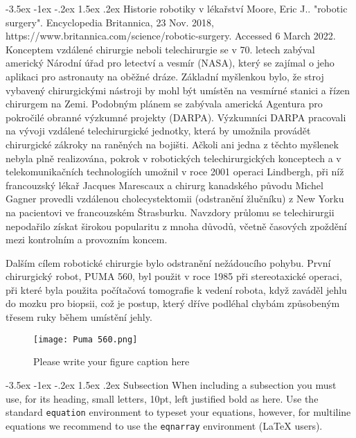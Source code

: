 \documentclass[a4paper,12pt]{article}
\makeatletter
\theoremstyle{definition}
\renewcommand\section{\@startsection {section}{1}{\z@}%
                                   {-3.5ex \@plus -1ex \@minus -.2ex}%
                                   {1.5ex \@plus.2ex}%
                                   {\large\bfseries}}
\renewcommand\subsection{\@startsection {subsection}{1}{\z@}%
                                   {-3.5ex \@plus -1ex \@minus -.2ex}%
                                   {1.5ex \@plus.2ex}%
                                   {\normalsize\bfseries}}
\makeatother
\begin{document}
\pagebreak

\section{Historie robotiky v lékařství}
\label{sec:2}
Moore, Eric J.. "robotic surgery". Encyclopedia Britannica, 23 Nov. 2018, https://www.britannica.com/science/robotic-surgery. Accessed 6 March 2022.
\\

Konceptem vzdálené chirurgie neboli telechirurgie se v 70. letech zabýval americký Národní úřad pro letectví a vesmír (NASA), který se zajímal o jeho aplikaci pro astronauty na oběžné dráze. Základní myšlenkou bylo, že stroj vybavený chirurgickými nástroji by mohl být umístěn na vesmírné stanici a řízen chirurgem na Zemi. Podobným plánem se zabývala americká Agentura pro pokročilé obranné výzkumné projekty (DARPA). Výzkumníci DARPA pracovali na vývoji vzdálené telechirurgické jednotky, která by umožnila provádět chirurgické zákroky na raněných na bojišti. Ačkoli ani jedna z těchto myšlenek nebyla plně realizována, pokrok v robotických telechirurgických konceptech a v telekomunikačních technologiích umožnil v roce 2001 operaci Lindbergh, při níž francouzský lékař Jacques Marescaux a chirurg kanadského původu Michel Gagner provedli vzdálenou cholecystektomii (odstranění žlučníku) z New Yorku na pacientovi ve francouzském Štrasburku. Navzdory průlomu se telechirurgii nepodařilo získat širokou popularitu z mnoha důvodů, včetně časových zpoždění mezi kontrolním a provozním koncem.

Dalším cílem robotické chirurgie bylo odstranění nežádoucího pohybu. První chirurgický robot, PUMA 560, byl použit v roce 1985 při stereotaxické operaci, při které byla použita počítačová tomografie k vedení robota, když zaváděl jehlu do mozku pro biopsii, což je postup, který dříve podléhal chybám způsobeným třesem ruky během umístění jehly.

\begin{figure}[h]
\begin{center}
\texttt{[image: Puma 560.png]}
\caption{Please write your figure caption here}
\label{fig:1}
\end{center}
\end{figure}


\subsection{Subsection}
\label{subsec:1}
When including a subsection you must use, for its heading, small
letters, 10pt, left justified bold as here.
Use the standard \verb|equation| environment to typeset your equations, however, for multiline equations we recommend to use the \verb|eqnarray| environment (\LaTeX{} users).
\end{document}
